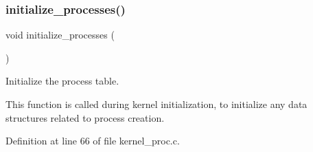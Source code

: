 \subsubsection{\texorpdfstring{initialize\+\_\+processes()}{initialize\_processes()}}
{\footnotesize\ttfamily void initialize\+\_\+processes (\begin{DoxyParamCaption}{ }\end{DoxyParamCaption})}



Initialize the process table. 

This function is called during kernel initialization, to initialize any data structures related to process creation. 

Definition at line 66 of file kernel\+\_\+proc.\+c.

